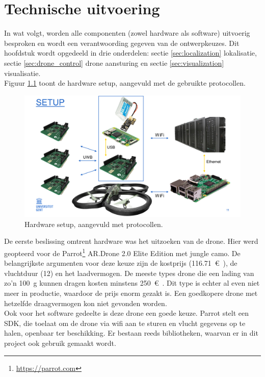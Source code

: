 \chapter{Technische uitvoering}
In wat volgt, worden alle componenten (zowel hardware als software) uitvoerig besproken en wordt een verantwoording gegeven van de ontwerpkeuzes.
Dit hoofdstuk wordt opgedeeld in drie onderdelen: sectie \ref{sec:localization} lokalisatie, sectie \ref{sec:drone_control} drone aansturing en sectie \ref{sec:visualization} visualisatie.\\

Figuur \ref{fig:setup} toont de hardware setup, aangevuld met de gebruikte protocollen.\\
\begin{figure}[p]
	\centering
	\includegraphics[width=\textwidth]{Setup}
	\caption[Setup]{Hardware setup, aangevuld met protocollen.}
	\label{fig:setup}
\end{figure}

De eerste beslissing omtrent hardware was het uitzoeken van de drone.
Hier werd geopteerd voor de Parrot\footnote{\url{https://parrot.com}} AR.Drone 2.0 Elite Edition met jungle camo.
De belangrijkste argumenten voor deze keuze zijn de kostprijs (\SI{116.71}{\euro{}}), de vluchtduur (\SI{12}{\min}) en het laadvermogen.
De meeste types drone die een lading van zo'n \SI{100}{\g} kunnen dragen kosten minstens \SI{250}{\euro{}}.
Dit type is echter al even niet meer in productie, waardoor de prijs enorm gezakt is.
Een goedkopere drone met hetzelfde draagvermogen kon niet gevonden worden.\\

Ook voor het software gedeelte is deze drone een goede keuze. Parrot stelt een SDK, die toelaat om de drone via wifi aan te sturen en vlucht gegevens op te halen, openbaar ter beschikking.
Er bestaan reeds bibliotheken, waarvan er in dit project ook gebruik gemaakt wordt.\\

